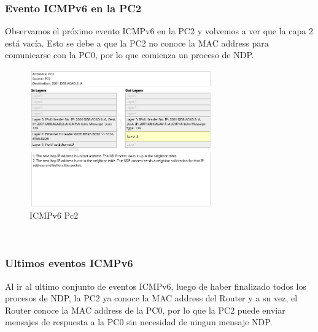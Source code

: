 \documentclass[a4paper,12pt]{article}
\begin{document}
\FloatBarrier

\subsubsection{Evento ICMPv6 en la PC2}
Observamos el próximo evento ICMPv6 en la PC2 y volvemos a ver que la capa 2 está vacía. Esto se debe a que la PC2 no conoce la MAC address para comunicarse con la PC0, por lo que comienza un proceso de NDP.\\
\begin{figure}[h]
    \centering
    \includegraphics[width=0.7\textwidth]{imagenes/5.png}
    \caption{ICMPv6 Pc2}
\end{figure}\\

\FloatBarrier
\subsubsection{Ultimos eventos ICMPv6}
Al ir al ultimo conjunto de eventos ICMPv6, luego de haber finalizado todos los procesos de NDP, la PC2 ya conoce la MAC address del Router y a su vez, el Router conoce la MAC address de la PC0, por lo que la PC2 puede enviar mensajes de respuesta a la PC0 sin necesidad de ningun mensaje NDP.\\
\end{document}
